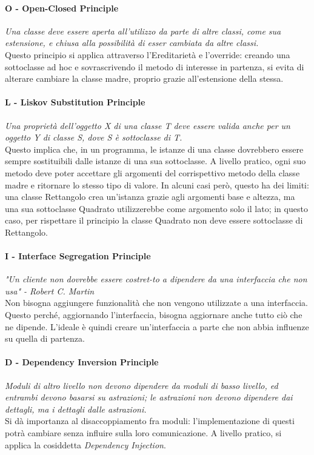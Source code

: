 \documentclass{article}
\begin{document}
            \paragraph{O - Open-Closed Principle} \textit{Una classe deve essere aperta all'utilizzo da parte di altre classi, come sua estensione, e chiusa alla possibilità di esser cambiata da altre classi.}\\
            Questo principio si applica attraverso l'Ereditarietà e l'override: creando una sottoclasse ad hoc e sovrascrivendo il metodo di interesse in partenza, si evita di alterare cambiare la classe madre, proprio grazie all'estensione della stessa.
            \paragraph{L - Liskov Substitution Principle} \textit{Una proprietà dell'oggetto X di una classe T deve essere valida anche per un oggetto Y di classe S, dove S è sottoclasse di T.}\\
            Questo implica che, in un programma, le istanze di una classe dovrebbero essere sempre sostituibili dalle istanze di una sua sottoclasse. A livello pratico, ogni suo metodo deve poter accettare gli argomenti del corrispettivo metodo della classe madre e ritornare lo stesso tipo di valore. In alcuni casi però, questo ha dei limiti: una classe Rettangolo crea un'istanza grazie agli argomenti base e altezza, ma una sua sottoclasse Quadrato utilizzerebbe come argomento solo il lato; in questo caso, per rispettare il principio la classe Quadrato non deve essere sottoclasse di Rettangolo.
            \paragraph{I - Interface Segregation Principle}
                \textit{"Un cliente non dovrebbe essere costret-to a dipendere da una interfaccia che non usa" - Robert C. Martin}\\
                Non bisogna aggiungere funzionalità che non vengono utilizzate a una interfaccia. Questo perché, aggiornando l'interfaccia, bisogna aggiornare anche tutto ciò che ne dipende. L'ideale è quindi creare un'interfaccia a parte che non abbia influenze su quella di partenza.
            \paragraph{D - Dependency Inversion Principle} 
                \textit{Moduli di altro livello non devono dipendere da moduli di basso livello, ed entrambi devono basarsi su astrazioni; le astrazioni non devono dipendere dai dettagli, ma i dettagli dalle astrazioni.}\\
                Si dà importanza al disaccoppiamento fra moduli: l'implementazione di questi potrà cambiare senza influire sulla loro comunicazione. A livello pratico, si applica la cosiddetta \textit{Dependency Injection}.
\end{document}
